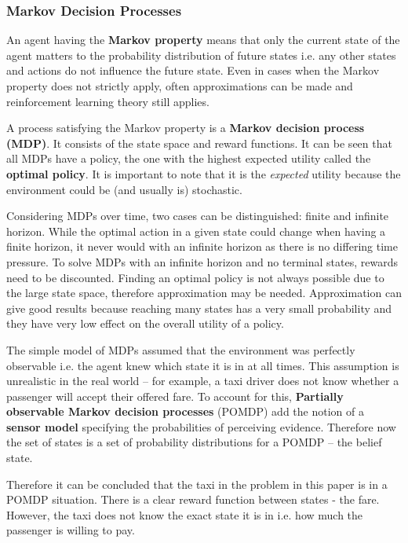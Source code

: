 \subsubsection{Markov Decision Processes}

An agent having the \textbf{Markov property} means that only the current state
of the agent matters to the probability distribution of future states i.e. any
other states and actions do not influence the future state. Even in cases when
the Markov property does not strictly apply, often approximations can be made
and reinforcement learning theory still applies.
\parencite{Sutton1998ai+reinforcement}

A process satisfying the Markov property is a
\textbf{Markov decision process (MDP)}. It consists of the state space and
reward functions. It can be seen that all MDPs have a policy, the one with the
highest expected utility called the \textbf{optimal policy}. It is important to
note that it is the \textit{expected} utility because the environment could be
(and usually is) stochastic. \parencite{Russell2010ai+modern}

Considering MDPs over time, two cases can be distinguished: finite and infinite
horizon. While the optimal action in a given state could change when having a
finite horizon, it never would with an infinite horizon as there is no
differing time pressure. To solve MDPs with an infinite horizon and no terminal
states, rewards need to be discounted. Finding an optimal policy is not always
possible due to the large state space, therefore approximation may be needed.
Approximation can give good results because reaching many states has a very
small probability and they have very low effect on the overall utility of a
policy. \parencite{Russell2010ai+modern}

The simple model of MDPs assumed that the environment was perfectly observable
i.e. the agent knew which state it is in at all times. This assumption is
unrealistic in the real world -- for example, a taxi driver does not know
whether a passenger will accept their offered fare. To account for this,
\textbf{Partially observable Markov decision processes} (POMDP) add the notion
of a \textbf{sensor model} specifying the probabilities of perceiving evidence.
Therefore now the set of states is a set of probability distributions for a
POMDP -- the belief state. \parencite{Russell2010ai+modern}

Therefore it can be concluded that the taxi in the problem in this paper is in a POMDP situation. There is a clear reward function between states - the fare. However, the taxi does not know the exact state it is in i.e. how much the passenger is willing to pay.

